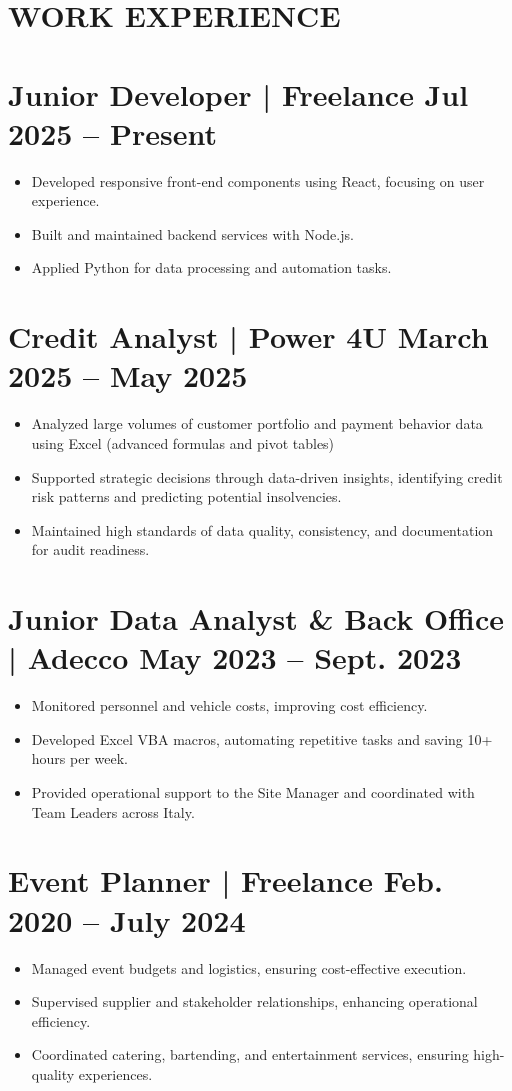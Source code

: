 \documentclass[a4paper,10pt]{article}
\newcommand{\datedsection}[2]{%
  \section*{#1 \hfill \small #2}%
}
\begin{document}
\section*{WORK EXPERIENCE}
\datedsection{Junior Developer | Freelance}{Jul 2025 -- Present}
\begin{itemize}[leftmargin=*, label={$\bullet$}]
    \item Developed responsive front-end components using React, focusing on user experience.
    \item Built and maintained backend services with Node.js.
    \item Applied Python for data processing and automation tasks.
\end{itemize}

\datedsection{Credit Analyst | Power 4U}{March 2025 -- May 2025}
\begin{itemize}[leftmargin=*, label={$\bullet$}]
    \item Analyzed large volumes of customer portfolio and payment behavior data using Excel (advanced formulas and pivot tables)
    \item Supported strategic decisions through data-driven insights, identifying credit risk patterns and predicting potential insolvencies.
    \item Maintained high standards of data quality, consistency, and documentation for audit readiness.
\end{itemize}

\datedsection{Junior Data Analyst \& Back Office | Adecco}{May 2023 -- Sept. 2023}
\begin{itemize}[leftmargin=*, label={$\bullet$}]
    \item Monitored personnel and vehicle costs, improving cost efficiency.
    \item Developed Excel VBA macros, automating repetitive tasks and saving 10+ hours per week.
    \item Provided operational support to the Site Manager and coordinated with Team Leaders across Italy.
\end{itemize}

\datedsection{Event Planner | Freelance}{Feb. 2020 -- July 2024}
\begin{itemize}[leftmargin=*, label={$\bullet$}]
    \item Managed event budgets and logistics, ensuring cost-effective execution.
    \item Supervised supplier and stakeholder relationships, enhancing operational efficiency.
    \item Coordinated catering, bartending, and entertainment services, ensuring high-quality experiences.
\end{itemize}
\end{document}
